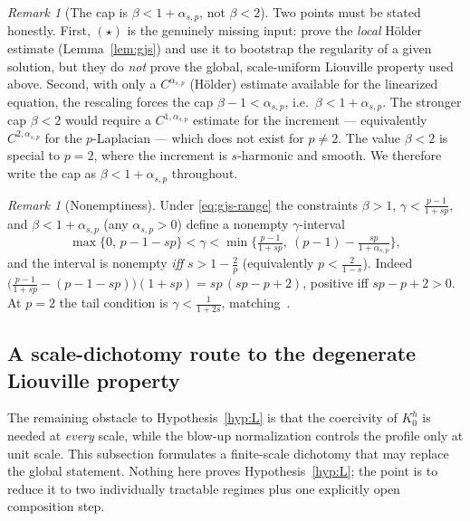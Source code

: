 \documentclass[11pt]{amsart}
\theoremstyle{plain}
\theoremstyle{definition}
\theoremstyle{remark}
\newtheorem{remark}[theorem]{Remark}
\newcommand{\asp}{\alpha_{s,p}}
\begin{document}
\begin{remark}[The cap is $\beta<1+\asp$, not $\beta<2$]\label{rem:incr-cap}
Two points must be stated honestly. First, $(\star)$ is the genuinely missing
input: \cite{BLS,GJS} prove the \emph{local} H\"older estimate
(Lemma~\ref{lem:gjs}) and use it to bootstrap the regularity of a given
solution, but they do \emph{not} prove the global, scale-uniform Liouville
property used above. Second, with only a $C^{\asp}$ (H\"older) estimate
available for the linearized equation, the rescaling forces the cap
$\beta-1<\asp$, i.e.\ $\beta<1+\asp$. The stronger cap $\beta<2$ would require a
$C^{1,\asp}$ estimate for the increment --- equivalently $C^{2,\asp}$ for the
$p$-Laplacian --- which does not exist for $p\neq2$. The value $\beta<2$ is
special to $p=2$, where the increment is $s$-harmonic and smooth. We therefore
write the cap as $\beta<1+\asp$ throughout.
\end{remark}

\begin{remark}[Nonemptiness]\label{rem:nonempty}
Under \eqref{eq:gjs-range} the constraints $\beta>1$, $\gamma<\frac{p-1}{1+sp}$,
and $\beta<1+\asp$ (any $\asp>0$) define a nonempty $\gamma$-interval
\[
  \max\Big\{0,\,p-1-sp\Big\}<\gamma<
   \min\Big\{\tfrac{p-1}{1+sp},\ (p-1)-\tfrac{sp}{1+\asp}\Big\},
\]
and the interval is nonempty \emph{iff} $s>1-\frac2p$ (equivalently
$p<\frac2{1-s}$). Indeed $\big(\tfrac{p-1}{1+sp}-(p-1-sp)\big)(1+sp)
=sp\,(sp-p+2)$, positive iff $sp-p+2>0$. At $p=2$ the tail condition is
$\gamma<\frac1{1+2s}$, matching~\cite{PTU}.
\end{remark}

\subsection{A scale-dichotomy route to the degenerate Liouville property}
\label{ssec:dichotomy}
The remaining obstacle to Hypothesis~\ref{hyp:L} is that the coercivity of
$K_0^h$ is needed at \emph{every} scale, while the blow-up normalization
controls the profile only at unit scale. This subsection formulates a
finite-scale dichotomy that may replace the global statement. Nothing here
proves Hypothesis~\ref{hyp:L}; the point is to reduce it to two individually
tractable regimes plus one explicitly open composition step.
\end{document}
